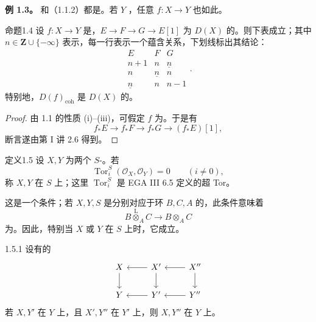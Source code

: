 \textbf{例 1.3。} 和（1.1.2）都是。若 $Y$ ，任意 $f:X\to Y$ 也如此。
\begin{SGAresult}{命题}{1.4}
设 $f:X\to Y$ 是，$E\to F\to G\to E[1]$ 为 $D(X)$ 的。则下表成立；其中 $n\in\mathbf Z\cup\{-\infty\}$ 表示，每一行表示一个蕴含关系，下划线标出其结论：
\[
\begin{array}{ccc}E&F&G\\n+1&n&\underline n\\n&\underline n&n\\\underline n&n&n-1\end{array}.
\]
特别地，$D(f)_{\mathrm{coh}}$ 是 $D(X)$ 的。
\end{SGAresult}
\begin{proof}
由 1.1 的性质 (i)--(iii)，可假定 $f$ 为。于是有
\[f_*E\longrightarrow f_*F\longrightarrow f_*G\longrightarrow(f_*E)[1],\]
断言遂由第 I 讲 2.6 得到。
\end{proof}
\begin{SGAresult}{定义}{1.5}
设 $X,Y$ 为两个 $S$-。若
\[\operatorname{Tor}_i^S(\mathcal O_X,\mathcal O_Y)=0\qquad(i\ne0),\]
称 $X,Y$ 在 $S$ 上；这里 $\operatorname{Tor}_i^S$ 是 EGA III 6.5 定义的超 Tor。
\end{SGAresult}
这是一个条件；若 $X,Y,S$ 是分别对应于环 $B,C,A$ 的，此条件意味着
\[B\mathbin{\overset{\mathrm L}{\otimes}}_AC\longrightarrow B\otimes_AC\]
为。因此，特别当 $X$ 或 $Y$ 在 $S$ 上时，它成立。
\begin{SGAresult}{}{1.5.1}
设有的
\[
\begin{tikzcd}X\arrow[d]&X'\arrow[l]\arrow[d]&X''\arrow[l]\arrow[d]\\Y&Y'\arrow[l]&Y''\arrow[l]\end{tikzcd}
\]
若 $X,Y'$ 在 $Y$ 上，且 $X',Y''$ 在 $Y'$ 上，则 $X,Y''$ 在 $Y$ 上。
\end{SGAresult}
